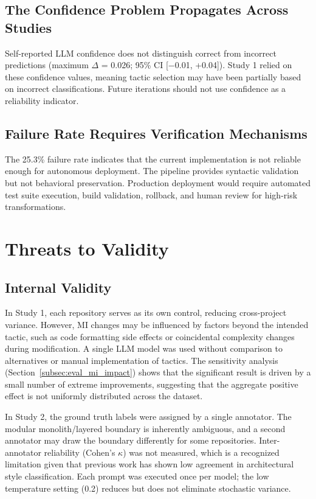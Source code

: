 \subsection{The Confidence Problem Propagates Across Studies}

Self-reported LLM confidence does not distinguish correct from incorrect predictions (maximum $\Delta$ = 0.026; 95\% CI [$-$0.01, +0.04]). Study 1 relied on these confidence values, meaning tactic selection may have been partially based on incorrect classifications. Future iterations should not use confidence as a reliability indicator.

\subsection{Failure Rate Requires Verification Mechanisms}

The 25.3\% failure rate indicates that the current implementation is not reliable enough for autonomous deployment. The pipeline provides syntactic validation but not behavioral preservation. Production deployment would require automated test suite execution, build validation, rollback, and human review for high-risk transformations.

\section{Threats to Validity}
\label{sec:eval_threats}

\subsection{Internal Validity}

In Study 1, each repository serves as its own control, reducing cross-project variance. However, MI changes may be influenced by factors beyond the intended tactic, such as code formatting side effects or coincidental complexity changes during modification. A single LLM model was used without comparison to alternatives or manual implementation of tactics. The sensitivity analysis (Section~\ref{subsec:eval_mi_impact}) shows that the significant result is driven by a small number of extreme improvements, suggesting that the aggregate positive effect is not uniformly distributed across the dataset.

In Study 2, the ground truth labels were assigned by a single annotator. The modular monolith/layered boundary is inherently ambiguous, and a second annotator may draw the boundary differently for some repositories. Inter-annotator reliability (Cohen's $\kappa$) was not measured, which is a recognized limitation given that previous work has shown low agreement in architectural style classification. Each prompt was executed once per model; the low temperature setting (0.2) reduces but does not eliminate stochastic variance.

